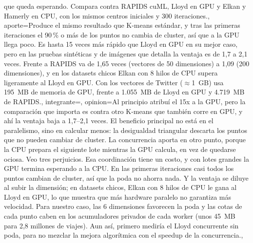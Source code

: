 {{    que queda esperando. Compara contra RAPIDS cuML, Lloyd en GPU y Elkan y Hamerly en CPU, con los
    mismos centros iniciales y 300 iteraciones.},
  aporte={Produce el mismo resultado que K-means estándar, y tras las primeras iteraciones el
    90\,\% o más de los puntos no cambia de cluster, así que a la GPU llega poco. Es hasta 15 veces
    más rápido que Lloyd en GPU en su mejor caso, pero en las pruebas sintéticas y de imágenes que
    detalla la ventaja es de 1,7 a 2,1 veces. Frente a RAPIDS va de 1,65 veces (vectores de 50
    dimensiones) a 1,09 (200 dimensiones), y en los datasets chicos Elkan con 8 hilos de CPU supera
    ligeramente al Lloyd en GPU. Con los vectores de Twitter ($\approx$1~GB) usa 195~MB de memoria de
    GPU, frente a 1.055~MB de Lloyd en GPU y 4.719~MB de RAPIDS.},
  integrante={\nombreRody},
  opinion={Al principio atribuí el 15x a la GPU, pero la comparación que importa es contra otro
    K-means que también corre en GPU, y ahí la ventaja baja a 1,7--2,1 veces. El beneficio principal
    no está en el paralelismo, sino en calcular menos: la desigualdad triangular descarta los puntos
    que no pueden cambiar de cluster. La concurrencia aporta en otro punto, porque la CPU prepara el
    siguiente lote mientras la GPU calcula, en vez de quedarse ociosa. Veo tres perjuicios. Esa
    coordinación tiene un costo, y con lotes grandes la GPU termina esperando a la CPU. En las
    primeras iteraciones casi todos los puntos cambian de cluster, así que la poda no ahorra nada.
    Y la ventaja se diluye al subir la dimensión; en datasets chicos, Elkan con 8 hilos de CPU le
    gana al Lloyd en GPU, lo que muestra que más hardware paralelo no garantiza más velocidad. Para
    nuestro caso, las 6 dimensiones favorecen la poda y las cotas de cada punto caben en los
    acumuladores privados de cada worker (unos 45~MB para 2,8 millones de viajes). Aun así, primero
    mediría el Lloyd concurrente sin poda, para no mezclar la mejora algorítmica con el speedup de la
    concurrencia.},
}

